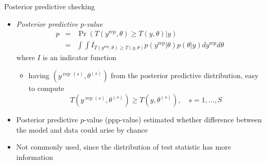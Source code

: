 \documentclass[t]{beamer}
\DeclareMathOperator{\rep}{\mathrm{rep}}
\begin{document}
\begin{frame}[fragile]

  {\Large\color{navyblue} Posterior predictive checking}

  \begin{itemize}
  \item<1-> \textit{Posterior predictive $p$-value}
    \begin{eqnarray*}
      p & = & \Pr(T(y^{\rep},\theta)\geq T(y,\theta)|y)\\
      & = & \int\int
      I_{T(y^{\rep},\theta)\geq T(y,\theta)}p(y^{\rep}|\theta)p(\theta|y)dy^{\rep}d\theta
    \end{eqnarray*}
    where $I$ is an indicator function
    \begin{itemize}
    \item<2->  having $(y^{\rep\,(s)},\theta^{(s)})$ from the posterior predictive
      distribution, easy to compute
      \begin{equation*}
        T(y^{\rep (s)},\theta^{(s)})\geq T(y,\theta^{(s)}), \quad s=1,\ldots,S
      \end{equation*}
    \end{itemize}
    \vspace{-1.5\baselineskip}
  \item<3-> Posterior predictive $p$-value (ppp-value) estimated whether
    difference between the model and data could arise by chance
  \item<4-> \color{black} Not commonly used, since the distribution of test
    statistic has more information
  \end{itemize}

\end{frame}




\end{document}
